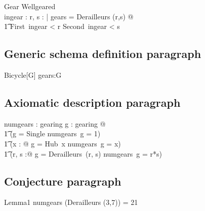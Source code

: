 \documentclass[letterpaper,11pt]{article}
\begin{document}
    \begin{schema}{Gear}
    Wellgeared \\
    ingear : \nat \cross \nat
    \where
    \exists r, s : \nat | gears = Derailleurs (r,s) @\\
    \t1 First~ingear < r \land Second~ingear < s
    \end{schema}

\subsection{Generic schema definition paragraph}

    \begin{schema}{Bicycle}[G]
    gears:\power G
    \end{schema}

\subsection{Axiomatic description paragraph}

    \begin{axdef}
    numgears : gearing \fun \nat
    \where
    \forall g : gearing @ \\
    \t1 (g = Single \implies numgears~g = 1) \land \\
    \t1 (\exists x : \nat @ g = Hub~x \implies numgears~g = x) \land \\
    \t1 (\exists r, s :\nat @ g = Derailleurs~(r, s) \implies numgears~g = r*s)
    \end{axdef}

\subsection{Conjecture paragraph}

    \begin{theorem}{Lemma1}
    \thrm numgears (Derailleurs (3,7)) = 21
    \end{theorem}
\end{document}
